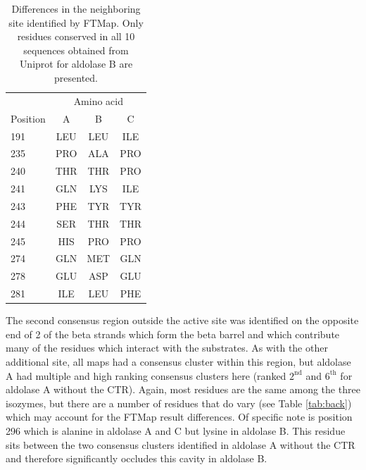 \documentclass[11pt,a4paper]{article}
\begin{document}
\begin{table}

\begin{center}
\begin{tabular}{l|c|c|c|}
 & \multicolumn{3}{c}{Amino acid}\\
Position & A & B & C \\
\hline
191 & LEU & LEU & ILE\\
235 & PRO & ALA & PRO\\
240 & THR & THR & PRO\\
241 & GLN & LYS & ILE\\
243 & PHE & TYR & TYR\\ 
244 & SER & THR & THR\\
245 & HIS & PRO & PRO\\
274 & GLN & MET & GLN\\
278 & GLU & ASP & GLU\\
281 & ILE & LEU & PHE 
\end{tabular}
\caption{  Differences in the neighboring site identified by FTMap.  Only residues conserved in all 10 sequences obtained from
	Uniprot for aldolase B are presented.
}\label{tab:neighbor}
\end{center}
\end{table}

	The second consensus region outside the active site was identified on the opposite end of 2 of the beta strands which form the beta barrel and which contribute many
	of the residues which interact with the substrates.  As with the other additional site, all
	maps had a consensus cluster within this region, but aldolase A had multiple and high ranking consensus clusters here (ranked $2^\mathrm{nd}$ and $6^\mathrm{th}$ 
	for aldolase A without the CTR).  Again, most
	residues are the same among the three isozymes, but there are a number of residues that do vary (see Table \ref{tab:back}) which may account for the FTMap result differences.
	Of specific note is position 296 which is alanine in aldolase A and C but lysine in aldolase B.  This residue sits between the two consensus clusters identified in
	aldolase A without the CTR and therefore significantly occludes this cavity in aldolase B. 
\end{document}
